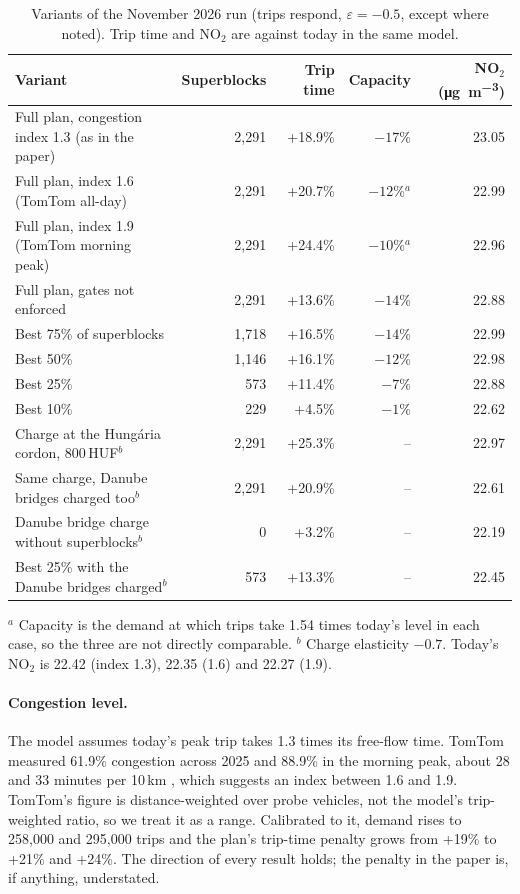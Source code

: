 \documentclass[11pt,a4paper]{article}
\begin{document}
\begin{table}[ht]
\centering\small
\caption{Variants of the November 2026 run (trips respond, $\varepsilon=-0.5$, except where noted). Trip time and NO$_2$ are against today in the same model.}\label{tab:improve}
\begin{tabularx}{\linewidth}{@{}>{\raggedright}Xrrrr@{}}
\toprule
Variant & Superblocks & Trip time & Capacity & NO$_2$ (\si{\micro\gram\per\cubic\metre}) \\
\midrule
Full plan, congestion index 1.3 (as in the paper) & 2,291 & +18.9\% & $-17$\% & 23.05 \\
Full plan, index 1.6 (TomTom all-day) & 2,291 & +20.7\% & $-12$\%$^a$ & 22.99 \\
Full plan, index 1.9 (TomTom morning peak) & 2,291 & +24.4\% & $-10$\%$^a$ & 22.96 \\
Full plan, gates not enforced & 2,291 & +13.6\% & $-14$\% & 22.88 \\
Best 75\% of superblocks & 1,718 & +16.5\% & $-14$\% & 22.99 \\
Best 50\% & 1,146 & +16.1\% & $-12$\% & 22.98 \\
Best 25\% & 573 & +11.4\% & $-7$\% & 22.88 \\
Best 10\% & 229 & +4.5\% & $-1$\% & 22.62 \\
Charge at the Hungária cordon, 800\,HUF$^b$ & 2,291 & +25.3\% & -- & 22.97 \\
Same charge, Danube bridges charged too$^b$ & 2,291 & +20.9\% & -- & 22.61 \\
Danube bridge charge without superblocks$^b$ & 0 & +3.2\% & -- & 22.19 \\
Best 25\% with the Danube bridges charged$^b$ & 573 & +13.3\% & -- & 22.45 \\
\bottomrule
\end{tabularx}

\smallskip
\footnotesize $^a$ Capacity is the demand at which trips take 1.54 times today's level in each case, so the three are not directly comparable. $^b$ Charge elasticity $-0.7$. Today's NO$_2$ is 22.42 (index 1.3), 22.35 (1.6) and 22.27 (1.9).
\end{table}

\paragraph{Congestion level.} The model assumes today's peak trip takes 1.3 times its free-flow time. TomTom measured 61.9\% congestion across 2025 and 88.9\% in the morning peak, about 28 and 33 minutes per 10\,km \citep{tomtom2025}, which suggests an index between 1.6 and 1.9. TomTom's figure is distance-weighted over probe vehicles, not the model's trip-weighted ratio, so we treat it as a range. Calibrated to it, demand rises to 258,000 and 295,000 trips and the plan's trip-time penalty grows from +19\% to +21\% and +24\%. The direction of every result holds; the penalty in the paper is, if anything, understated.
\end{document}
